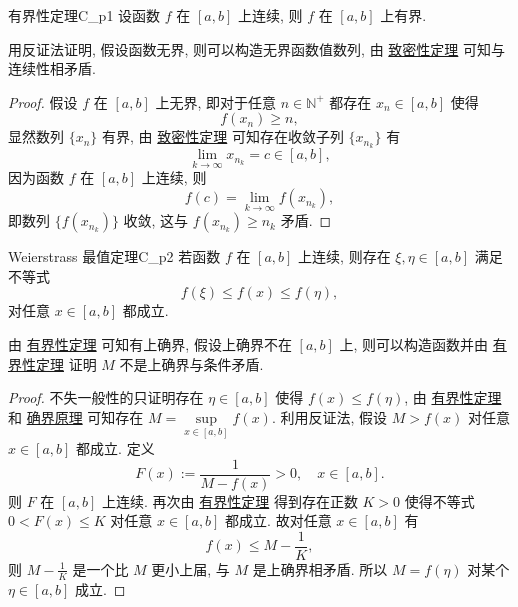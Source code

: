 \documentclass[cn,toc=twocol]{elegantbook}
\newcommand{\N}{\mathbb{N}}
\begin{document}
\vspace{0.5em}

\begin{theorem}{有界性定理}{C_p1}
设函数 $f$ 在 $[a,b]$ 上连续, 则 $f$ 在 $[a,b]$ 上有界.
\end{theorem}

\begin{idea*}
	用反证法证明, 假设函数无界, 则可以构造无界函数值数列, 由 \hyperref[thm:R4']{致密性定理} 可知与连续性相矛盾.
\end{idea*}

\begin{proof}
	假设 $f$ 在 $[a,b]$ 上无界, 即对于任意 $n \in \N^+$ 都存在 $x_n \in [a,b]$ 使得
	\[
		f(x_n) \ge n,
	\]
	显然数列 $\{x_n\}$ 有界, 由 \hyperref[thm:R4']{致密性定理} 可知存在收敛子列 $\{x_{n_k}\}$ 有
	\[
		\lim_{k\to\infty} x_{n_k} = c \in [a,b],
	\] 
	因为函数 $f$ 在 $[a,b]$ 上连续, 则
	\[
		f(c) = \lim_{k\to\infty} f(x_{n_k}),
	\]
	即数列 $\{f(x_{n_k})\}$ 收敛, 这与 $f(x_{n_k}) \ge n_k$ 矛盾.
\end{proof}

\vspace{0.5em}

\begin{theorem}{Weierstrass 最值定理}{C_p2}
	若函数 $f$ 在 $[a,b]$ 上连续, 则存在 $\xi ,\eta \in [a,b]$ 满足不等式
	\[
		f(\xi) \le f(x) \le f(\eta), 
	\]
	对任意 $x \in [a,b]$ 都成立.
\end{theorem}

\begin{idea*}
	由 \hyperref[thm:C_p1]{有界性定理} 可知有上确界, 假设上确界不在 $[a,b]$ 上, 则可以构造函数并由 \hyperref[thm:C_p1]{有界性定理} 证明 $M$ 不是上确界与条件矛盾.
\end{idea*}

\begin{proof}
	不失一般性的只证明存在 $\eta \in [a,b]$ 使得 $f(x) \le f(\eta)$, 由 \hyperref[thm:C_p1]{有界性定理} 和 \hyperref[thm:R1]{确界原理} 可知存在 $M = \sup\limits_{x \in [a,b]} f(x)$. 利用反证法, 假设 $M > f(x)$ 对任意 $x\in[a,b]$ 都成立. 定义
	\[
		F(x) := \frac{1}{M - f(x)} > 0,\quad x\in[a,b].
	\]
	则 $F$ 在 $[a,b]$ 上连续. 再次由 \hyperref[thm:C_p1]{有界性定理} 得到存在正数 $K > 0$ 使得不等式 $0 < F(x) \le K$ 对任意 $x\in[a,b]$ 都成立. 故对任意 $x\in[a,b]$ 有
	\[
		f(x) \le M - \frac{1}{K},
	\]
	则 $M - \frac{1}{K}$ 是一个比 $M$ 更小上届, 与 $M$ 是上确界相矛盾. 所以 $M= f(\eta)$ 对某个 $\eta\in[a,b]$ 成立.
\end{proof}
\end{document}
